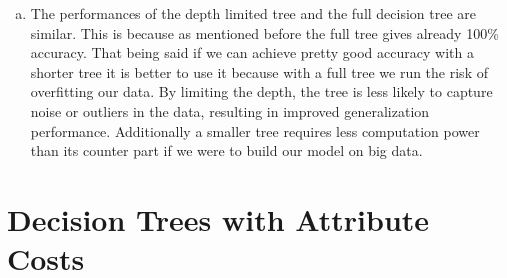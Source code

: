 \documentclass[11pt]{article}
\begin{document}
\begin{enumerate}[(a)]
		\item The performances of the depth limited tree and the full decision tree are similar. This is because as mentioned before the full tree gives already 100\% accuracy. That being said if we can achieve pretty good accuracy with a shorter tree it is better to use it because with a full tree we run the risk of overfitting our data. By limiting the depth, the tree is less likely to capture noise or outliers in the data, resulting in improved generalization performance. Additionally a smaller tree requires less computation power than its counter part if we were to build our model on big data.
		
		
		
	\end{enumerate}
\section{Decision Trees with Attribute Costs}
\end{document}
